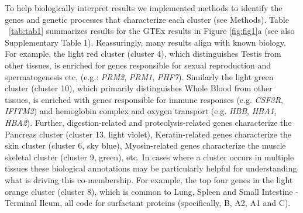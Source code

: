To help biologically interpret results we implemented methods to identify the genes and genetic processes that characterize each cluster (see Methods).
Table ~\ref{tab:tab1} summarizes results for the GTEx results in Figure \ref{fig:fig1}a (see also Supplementary Table 1). Reassuringly, many results align with known biology. For example,  the light red cluster (cluster 4), which distinguishes Testis from other tissues, is enriched for
genes responsible for sexual reproduction and spermatogenesis etc, (e.g.: \textit{PRM2}, \textit{PRM1}, \textit{PHF7}). Similarly the light green cluster (cluster 10), which primarily distinguishes Whole Blood from other tissues, is enriched with genes responsible for immune responses (e.g. \textit{CSF3R}, \textit{IFITM2}) and hemoglobin complex and oxygen transport (e.g. \textit{HBB}, \textit{HBA1}, \textit{HBA2}). Further, digestion-related and proteolysis-related genes characterize the Pancreas cluster (cluster 13, light violet), Keratin-related genes characterize the skin cluster (cluster 6, sky blue), Myosin-related genes characterize the muscle skeletal cluster (cluster 9, green), etc. In cases where a cluster occurs in multiple tissues these biological annotations may be particularly helpful for understanding what is driving this co-membership. For example, the top four genes in the  light orange cluster (cluster 8), which is common to Lung, Spleen and Small Intestine - Terminal Ileum,  all code for surfactant proteins (specifically, B, A2, A1 and C).



